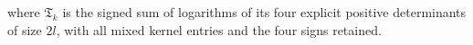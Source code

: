 where $\mathfrak T_k$ is the signed sum of logarithms of
its four explicit positive determinants of size $2l$, with all
mixed kernel entries and the four signs retained.